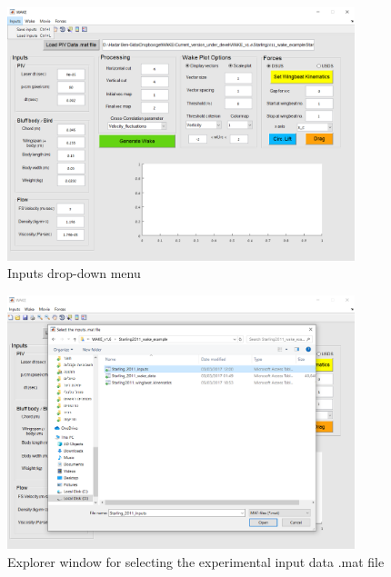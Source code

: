 \documentclass[12pt,a4paper]{article}
\begin{document}
\newpage
\begin{figure}[ht!]
	\centering
	\includegraphics[width=0.9\textwidth]{Inputs-drop-down-menu}
	\caption{Inputs drop-down menu}
	\label{fig:GUI-Inputs-drop-down-menu}
\end{figure}

\begin{figure}[ht!]
	\centering
	\includegraphics[width=0.9\textwidth]{select-inputs-mat-file}
	\caption{Explorer window for selecting the experimental input data .mat file}
	\label{fig:GUI-Select-inputs-mat-file}
\end{figure}
\end{document}
